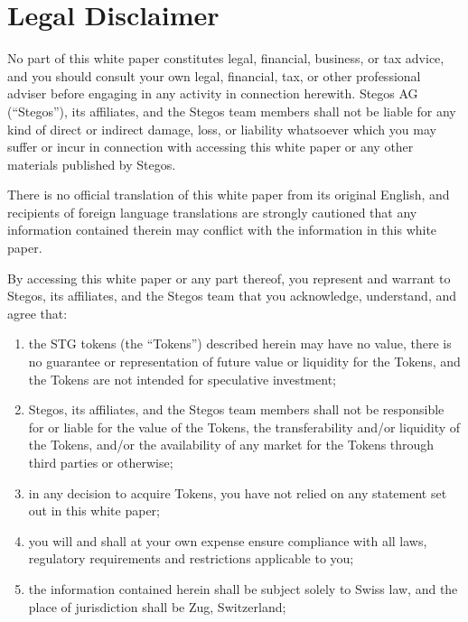 \documentclass[8pt,fleqn,openany]{book}
\begin{document}
{\chapter{Legal Disclaimer}

No part of this white paper constitutes legal, financial, business, or tax advice, and you should consult your own legal, financial, tax, or other professional adviser before engaging in any activity in connection herewith. Stegos AG (“Stegos”), its affiliates, and the Stegos team members shall not be liable for any kind of direct or indirect damage, loss, or liability whatsoever which you may suffer or incur in connection with accessing this white paper or any other materials published by Stegos. 

There is no official translation of this white paper from its original English, and recipients of foreign language translations are strongly cautioned that any information contained therein may conflict with the information in this white paper. 

By accessing this white paper or any part thereof, you represent and warrant to Stegos, its affiliates, and the Stegos team that you acknowledge, understand, and agree that: 

\begin{enumerate}[label=(\alph*)]
	\item the STG tokens (the “Tokens”) described herein may have no value, there is no guarantee or representation of future value or liquidity for the Tokens, and the Tokens are not intended for speculative investment; 

	\item Stegos, its affiliates, and the Stegos team members shall not be responsible for or liable for the value of the Tokens, the transferability and/or liquidity of the Tokens, and/or the availability of any market for the Tokens through third parties or otherwise; 

	\item in any decision to acquire Tokens, you have not relied on any statement set out in this white paper; 

	\item you will and shall at your own expense ensure compliance with all laws, regulatory requirements and restrictions applicable to you; 

	\item the information contained herein shall be subject solely to Swiss law, and the place of jurisdiction shall be Zug, Switzerland; 


\end{enumerate}}
\end{document}
